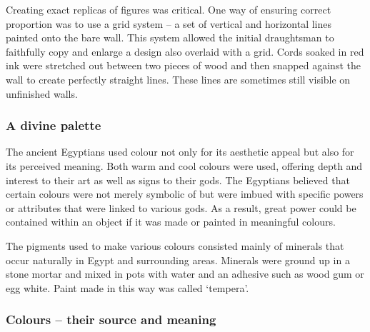 	Creating exact replicas of figures was critical. One way of ensuring correct proportion was to use a grid system – a set of vertical and horizontal lines painted onto the bare wall. This system allowed the initial draughtsman to faithfully copy and enlarge a design also overlaid with a grid. Cords soaked in red ink were stretched out between two pieces of wood and then snapped against the wall to create perfectly straight lines. These lines are sometimes still visible on unfinished walls.
	
	\subsubsection{A divine palette}
	
	The ancient Egyptians used colour not only for its aesthetic appeal but also for its perceived meaning. Both warm and cool colours were used, offering depth and interest to their art as well as signs to their gods. The Egyptians believed that certain colours were not merely symbolic of but were imbued with specific powers or attributes that were linked to various gods. As a result, great power could be contained within an object if it was made or painted in meaningful colours.
	
	The pigments used to make various colours consisted mainly of minerals that occur naturally in Egypt and surrounding areas. Minerals were ground up in a stone mortar and mixed in pots with water and an adhesive such as wood gum or egg white. Paint made in this way was called ‘tempera’.
	
	\subsubsection{Colours – their source and meaning}
	
